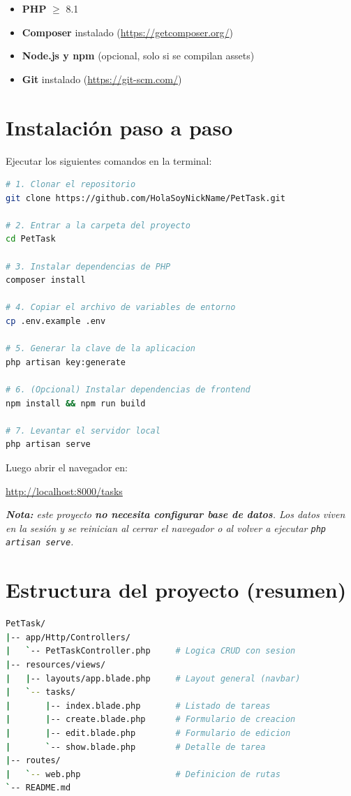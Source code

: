 \documentclass[11pt,a4paper]{article}
\begin{document}
\begin{itemize}[leftmargin=1.5em]
    \item \textbf{PHP} $\geq$ 8.1
    \item \textbf{Composer} instalado (\url{https://getcomposer.org/})
    \item \textbf{Node.js y npm} (opcional, solo si se compilan assets)
    \item \textbf{Git} instalado (\url{https://git-scm.com/})
\end{itemize}

\section{Instalación paso a paso}

Ejecutar los siguientes comandos en la terminal:

\begin{lstlisting}[language=bash, caption={Comandos de instalación}, numbers=none]
# 1. Clonar el repositorio
git clone https://github.com/HolaSoyNickName/PetTask.git

# 2. Entrar a la carpeta del proyecto
cd PetTask

# 3. Instalar dependencias de PHP
composer install

# 4. Copiar el archivo de variables de entorno
cp .env.example .env

# 5. Generar la clave de la aplicacion
php artisan key:generate

# 6. (Opcional) Instalar dependencias de frontend
npm install && npm run build

# 7. Levantar el servidor local
php artisan serve
\end{lstlisting}

Luego abrir el navegador en: \\
\centerline{\url{http://localhost:8000/tasks}}

\textit{\textbf{Nota:} este proyecto \textbf{no necesita configurar base de datos}. Los datos viven en la sesión y se reinician al cerrar el navegador o al volver a ejecutar \texttt{php artisan serve}.}

\section{Estructura del proyecto (resumen)}

\begin{lstlisting}[language=bash, numbers=none, caption={Estructura de carpetas}]
PetTask/
|-- app/Http/Controllers/
|   `-- PetTaskController.php     # Logica CRUD con sesion
|-- resources/views/
|   |-- layouts/app.blade.php     # Layout general (navbar)
|   `-- tasks/
|       |-- index.blade.php       # Listado de tareas
|       |-- create.blade.php      # Formulario de creacion
|       |-- edit.blade.php        # Formulario de edicion
|       `-- show.blade.php        # Detalle de tarea
|-- routes/
|   `-- web.php                   # Definicion de rutas
`-- README.md
\end{lstlisting}
\end{document}
